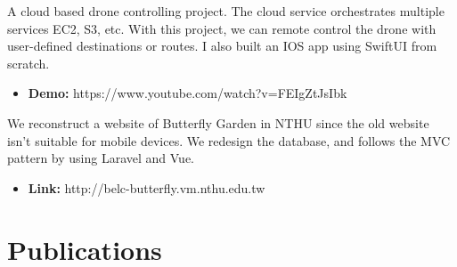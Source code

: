 \documentclass[margin]{res}
\begin{document}
\begin{resume}

A cloud based drone controlling project. The cloud service orchestrates multiple services EC2, S3, etc. With this project, we can remote control the drone with user-defined destinations or routes. I also built an IOS app using SwiftUI from scratch.
\begin{itemize}
    \item \textbf{Demo:} https://www.youtube.com/watch?v=FEIgZtJsIbk
\end{itemize}

We reconstruct a website of Butterfly Garden in NTHU since the old website isn't suitable for mobile devices. We redesign the database, and follows the MVC pattern by using Laravel and Vue.
\begin{itemize}
    \item \textbf{Link:} http://belc-butterfly.vm.nthu.edu.tw
\end{itemize}

\section{Publications}
\par
\normalfont{}



\end{resume}
\end{document}
